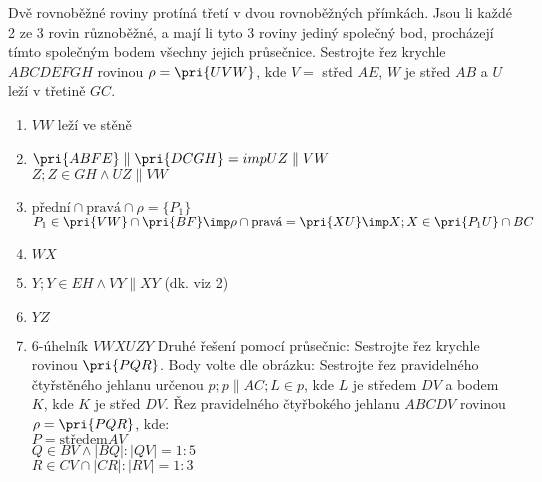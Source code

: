 \Poz Dvě rovnoběžné roviny protíná třetí v dvou rovnoběžných přímkách.
\Poz Jsou li každé 2 ze 3 rovin různoběžné, a mají li tyto 3 roviny jediný společný bod, procházejí tímto společným bodem všechny jejich průsečnice.
\Pr Sestrojte řez krychle $ABCDEFGH$ rovinou $\rho = \pri{UVW}$, kde $V=$ střed $AE$, $W$ je střed $AB$ a $U$ leží v třetině $GC$.
\begin{enumerate}
	\item $VW$ leží ve stěně
	\item $\pri{ABFE} \parallel \pri{DCGH} =imp UZ \parallel VW$\\
		$Z;Z\in GH \land UZ \parallel VW$
	\item $\text{přední}\cap\text{pravá}\cap \rho = \{P_1\}$ \\
		$P_1 \in \pri{VW} \cap \pri{BF}\imp \rho \cap \text{pravá} = \pri{XU}\imp X;X\in\pri{P_1U}\cap BC$
	\item $WX$
	\item $Y; Y \in EH \land VY \parallel XY$
		(dk. viz 2)
	\item $YZ$
	\item 6-úhelník $VWXUZY$
\Pr Druhé řešení pomocí průsečnic:
\Pr Sestrojte řez krychle rovinou $\pri{PQR}$. Body volte dle obrázku:
\Pr Sestrojte řez pravidelného čtyřstěného jehlanu určenou $p;p\parallel AC;L\in p$, kde $L$ je středem $DV$ a bodem $K$, kde $K$ je střed $DV$.
\Pr Řez pravidelného čtyřbokého jehlanu $ABCDV$ rovinou $\rho = \pri{PQR}$, kde:\\
		$P=\text{středem} AV$\\
		$Q \in BV \land |BQ| : |QV| = 1:5$\\
		$R\in CV \cap |CR|:|RV| = 1:3 $
\end{enumerate}

\EndDoc

